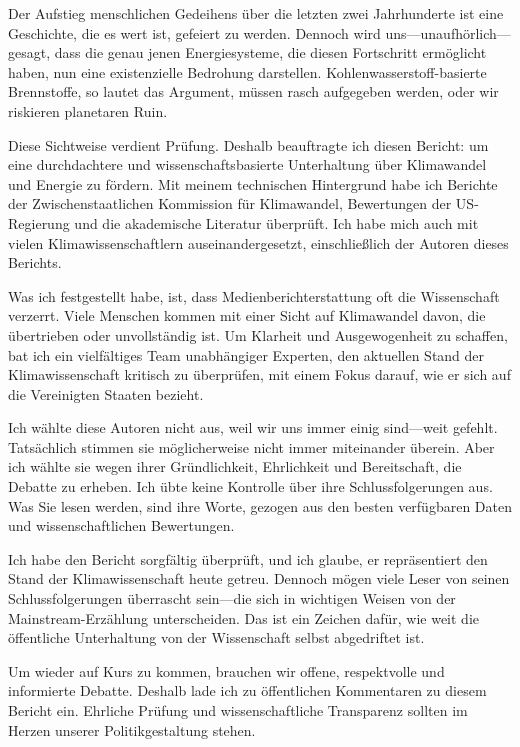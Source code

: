 \documentclass[12pt,paper=a4,DIV=12,parskip=never,chapterprefix=false,headings=standardclasses]{scrreprt}
\begin{document}
Der Aufstieg menschlichen Gedeihens über die letzten zwei Jahrhunderte ist eine Geschichte, die es wert ist, gefeiert zu werden. Dennoch wird uns—unaufhörlich—gesagt, dass die genau jenen Energiesysteme, die diesen Fortschritt ermöglicht haben, nun eine existenzielle Bedrohung darstellen. Kohlenwasserstoff-basierte Brennstoffe, so lautet das Argument, müssen rasch aufgegeben werden, oder wir riskieren planetaren Ruin.

Diese Sichtweise verdient Prüfung. Deshalb beauftragte ich diesen Bericht: um eine durchdachtere und wissenschaftsbasierte Unterhaltung über Klimawandel und Energie zu fördern. Mit meinem technischen Hintergrund habe ich Berichte der Zwischenstaatlichen Kommission für Klimawandel, Bewertungen der US-Regierung und die akademische Literatur überprüft. Ich habe mich auch mit vielen Klimawissenschaftlern auseinandergesetzt, einschließlich der Autoren dieses Berichts.

Was ich festgestellt habe, ist, dass Medienberichterstattung oft die Wissenschaft verzerrt. Viele Menschen kommen mit einer Sicht auf Klimawandel davon, die übertrieben oder unvollständig ist. Um Klarheit und Ausgewogenheit zu schaffen, bat ich ein vielfältiges Team unabhängiger Experten, den aktuellen Stand der Klimawissenschaft kritisch zu überprüfen, mit einem Fokus darauf, wie er sich auf die Vereinigten Staaten bezieht.

Ich wählte diese Autoren nicht aus, weil wir uns immer einig sind—weit gefehlt. Tatsächlich stimmen sie möglicherweise nicht immer miteinander überein. Aber ich wählte sie wegen ihrer Gründlichkeit, Ehrlichkeit und Bereitschaft, die Debatte zu erheben. Ich übte keine Kontrolle über ihre Schlussfolgerungen aus. Was Sie lesen werden, sind ihre Worte, gezogen aus den besten verfügbaren Daten und wissenschaftlichen Bewertungen.

Ich habe den Bericht sorgfältig überprüft, und ich glaube, er repräsentiert den Stand der Klimawissenschaft heute getreu. Dennoch mögen viele Leser von seinen Schlussfolgerungen überrascht sein—die sich in wichtigen Weisen von der Mainstream-Erzählung unterscheiden. Das ist ein Zeichen dafür, wie weit die öffentliche Unterhaltung von der Wissenschaft selbst abgedriftet ist.

Um wieder auf Kurs zu kommen, brauchen wir offene, respektvolle und informierte Debatte. Deshalb lade ich zu öffentlichen Kommentaren zu diesem Bericht ein. Ehrliche Prüfung und wissenschaftliche Transparenz sollten im Herzen unserer Politikgestaltung stehen.
\end{document}
